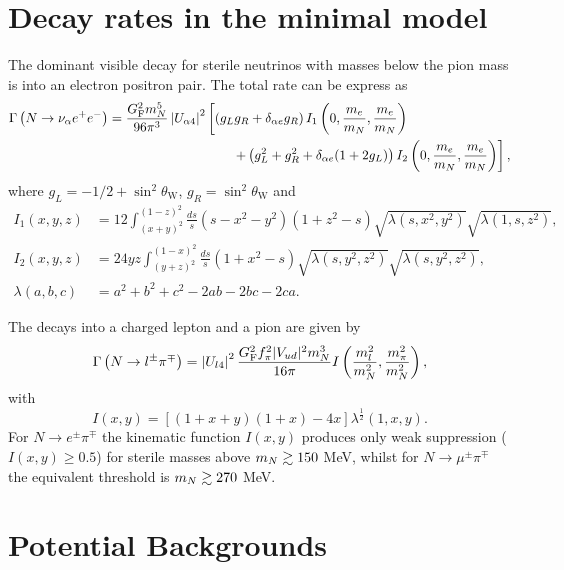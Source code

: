 \documentclass[11pt, a4paper]{article}
\def\ster{\ensuremath N}
\begin{document}
\appendix

\section{\label{app:decayrates}Decay rates in the minimal model}

The dominant visible decay for sterile neutrinos with masses below the pion
mass is into an electron positron pair. The total rate can be express as
%
\begin{align*} \Gamma\left(\ster\to \nu_\alpha e^+e^-\right) =
\frac{G_\text{F}^2m_\ster^5}{96\pi^3}\left|U_{\alpha 4}\right|^2&\left[\left( g_Lg_R + \delta_{\alpha e}g_R\right)I_1\left(0,\frac{m_e}{m_\ster}, \frac{
m_e}{m_\ster}\right)\right.\\ 
&\left.\qquad + \left(g_L^2 + g_R^2 + \delta_{\alpha e}(1+2g_L)\right)I_2\left(0,\frac{m_e}{m_\ster},\frac{m_e}{m_\ster}\right)\right],  \end{align*}
%
where $g_L = -1/2 + \sin^2\theta_\text{W}$, $g_R = \sin^2\theta_\text{W}$ and
% 
\begin{align*} I_1(x,y,z) & =12 \int_{(x+y)^2}^{(1-z)^2}
\frac{ds}{s}(s-x^2-y^2)(1+z^2-s)\sqrt{\lambda(s,x^2,y^2)}\sqrt{\lambda(1,s,z^2)},\\
I_2(x,y,z)& =24yz\int_{(y+z)^2}^{(1-x)^2}\frac{ds}{s}\left(1+x^2-s\right)\sqrt{\lambda\left(s,y^2,z^2\right)}\sqrt{\lambda\left(s,y^2,z^2\right)},\\
\lambda(a,b,c) &= a^2+b^2+c^2 - 2ab-2bc-2ca.  \end{align*}
%

The decays into a charged lepton and a pion are given by 
%
\[ \Gamma\left(\ster\to l^\pm\pi^\mp\right) =
\left|U_{l4}\right|^2\frac{G_\text{F}^2f_\pi^2 |V_{ud}|^2
m_\ster^3}{16\pi}I\left(\frac{m_l^2}{m_\ster^2} ,
\frac{m_\pi^2}{m_\ster^2}\right) , \] 
%
with \[ I(x,y) = \left[ \left( 1+x+y\right) \left(1+x\right) -4 x\right]
\lambda^\frac{1}{2}\left(1,x,y\right).  \]
%
For $N\to e^\pm\pi^\mp$ the kinematic function $I(x,y)$ produces only weak suppression ($I(x,y)\geq 0.5$) for sterile masses above $m_\ster\gtrsim 150$ MeV, whilst for $N\to
\mu^\pm\pi^\mp$ the equivalent threshold is $m_\ster\gtrsim 270$ MeV.

\section{Potential Backgrounds\label{app:bg}}
\end{document}
